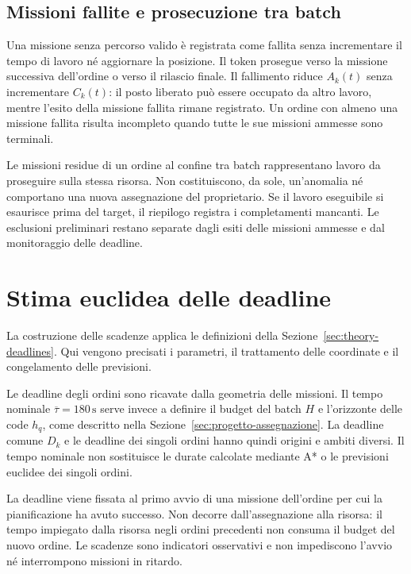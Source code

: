 \subsection{Missioni fallite e prosecuzione tra batch}

Una missione senza percorso valido è registrata come fallita senza
incrementare il tempo di lavoro né aggiornare la posizione. Il token
prosegue verso la missione successiva dell'ordine o verso il rilascio finale.
Il fallimento riduce $A_k(t)$ senza incrementare $C_k(t)$: il posto liberato
può essere occupato da altro lavoro, mentre l'esito della missione fallita
rimane registrato. Un ordine con almeno una missione fallita risulta
incompleto quando tutte le sue missioni ammesse sono terminali.

Le missioni residue di un ordine al confine tra batch rappresentano lavoro
da proseguire sulla stessa risorsa. Non costituiscono, da sole, un'anomalia
né comportano una nuova assegnazione del proprietario. Se il lavoro
eseguibile si esaurisce prima del target, il riepilogo registra i
completamenti mancanti. Le esclusioni preliminari restano separate dagli
esiti delle missioni ammesse e dal monitoraggio delle deadline.

\section{Stima euclidea delle deadline}
\label{sec:stima-deadline-manhattan}

La costruzione delle scadenze applica le definizioni della
Sezione~\ref{sec:theory-deadlines}. Qui vengono precisati i parametri,
il trattamento delle coordinate e il congelamento delle previsioni.

Le deadline degli ordini sono ricavate dalla geometria delle missioni.
Il tempo nominale $\overline{\tau}=180\,\mathrm{s}$ serve invece a definire
il budget del batch $H$ e l'orizzonte delle code $h_q$, come descritto nella
Sezione~\ref{sec:progetto-assegnazione}. La deadline comune $D_k$ e le
deadline dei singoli ordini hanno quindi origini e ambiti diversi.
Il tempo nominale non sostituisce le durate calcolate mediante A* o le
previsioni euclidee dei singoli ordini.

La deadline viene fissata al primo avvio di una missione dell'ordine per cui
la pianificazione ha avuto successo. Non decorre dall'assegnazione alla risorsa:
il tempo impiegato dalla risorsa negli ordini precedenti non consuma il
budget del nuovo ordine. Le scadenze sono indicatori osservativi e non
impediscono l'avvio né interrompono missioni in ritardo.


